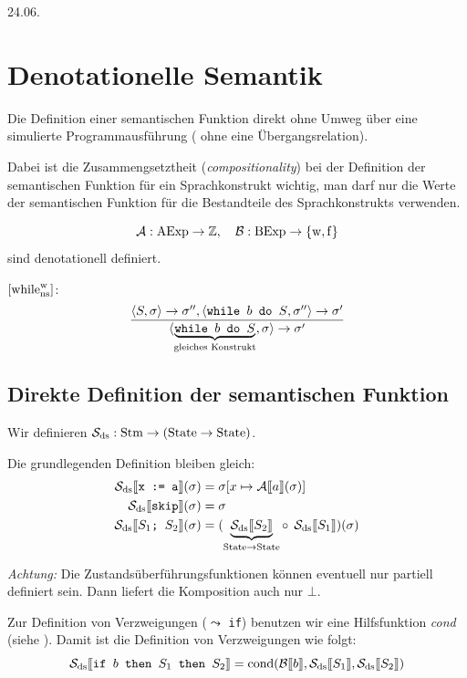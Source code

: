 \newpage
\hfill 24.06.

\section{Denotationelle Semantik}


\begin{remark}[Ziel]
    Die Definition einer semantischen Funktion direkt ohne Umweg über eine simulierte Programmausführung (\dh{} ohne eine Übergangsrelation).

    Dabei ist die Zusammengsetztheit (\emph{compositionality}) bei der Definition der semantischen Funktion für ein Sprachkonstrukt wichtig, \dh{} man darf nur die Werte der semantischen Funktion für die Bestandteile des Sprachkonstrukts verwenden.
\end{remark}

\begin{example}
    \[ \A: \AExp \to \mathbb{Z}, \quad \B: \BExp \to \bool \]
    sind denotationell definiert.
\end{example}

\begin{example}[Gegenbeispiel]
    $\infruleNs[\true]{while}$: \[
        \frac{
            \strans{S}{\sigma}{\sigma''}, \strans{\texttt{while $b$ do $S$}}{\sigma''}{\sigma'}
        }{
            \strans{\underbrace{\texttt{while $b$ do $S$}}_{\text{gleiches Konstrukt}}}{\sigma}{\sigma'}
        }
    \]
\end{example}



\subsection{Direkte Definition der semantischen Funktion}

\begin{definition}
    Wir definieren $\mathcal{S}_{\text{ds}} : \Stm \to (\State \to \State)$.

    Die grundlegenden Definition bleiben gleich:
    \begin{align*}
        \Sdssem{\texttt{x := a}}(\sigma) & = \sigma[x \mapsto \Asem{a}(\sigma)] \\
        \Sdssem{\texttt{skip}}(\sigma) & = \sigma \\
        \Sdssem{\texttt{$S_1$; $S_2$}}(\sigma) & = (\underbrace{\Sdssem{S_2}}_{\State \to \State} \circ\;\, \Sdssem{S_1})(\sigma)
    \end{align*}

    \emph{Achtung:} Die Zustandsüberführungsfunktionen können eventuell nur partiell definiert sein. Dann liefert die Komposition auch nur $\bot$.

    Zur Definition von Verzweigungen ($\leadsto$ \texttt{if}) benutzen wir eine Hilfsfunktion \emph{cond} (siehe ). Damit ist die Definition von Verzweigungen wie folgt:
    \[
        \Sdssem{\texttt{if $b$ then $S_1$ then $S_2$}} = \cond(\Bsem{b}, \Sdssem{S_1}, \Sdssem{S_2})
    \]
\end{definition}


